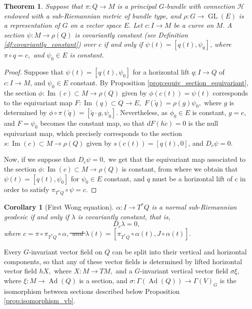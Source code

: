 \documentclass[12pt, letterpaper, reqno]{amsart}
\theoremstyle{definition}
\theoremstyle{plain}
\newtheorem{thm}{Theorem}
\newtheorem{cor}{Corollary}
\theoremstyle{remark}
\providecommand{\DIFadd}[1]{{\protect\color{blue}\uwave{#1}}} %
\providecommand{\DIFdel}[1]{{\protect\color{red}\sout{#1}}}                      %
\providecommand{\DIFaddbegin}{} %
\providecommand{\DIFaddend}{} %
\providecommand{\DIFdelbegin}{} %
\providecommand{\DIFdelend}{} %
\newcommand{\DIFscaledelfig}{0.5}
\newlength{\DIFdelgraphicswidth} %
\newlength{\DIFdelgraphicsheight} %
\newcommand{\DIFaddincludegraphics}[2][]{{\color{blue}\fbox{\DIFOincludegraphics[#1]{#2}}}} %
\newcommand{\DIFdelincludegraphics}[2][]{%
\sbox{\DIFdelgraphicsbox}{\DIFOincludegraphics[#1]{#2}}%
\settoboxwidth{\DIFdelgraphicswidth}{\DIFdelgraphicsbox} %
\settoboxtotalheight{\DIFdelgraphicsheight}{\DIFdelgraphicsbox} %
\scalebox{\DIFscaledelfig}{%
\parbox[b]{\DIFdelgraphicswidth}{\usebox{\DIFdelgraphicsbox}\\[-\baselineskip] \rule{\DIFdelgraphicswidth}{0em}}\llap{\resizebox{\DIFdelgraphicswidth}{\DIFdelgraphicsheight}{%
\setlength{\unitlength}{\DIFdelgraphicswidth}%
\begin{picture}(1,1)%
\thicklines\linethickness{2pt} %
{\color[rgb]{1,0,0}\put(0,0){\framebox(1,1){}}}%
{\color[rgb]{1,0,0}\put(0,0){\line( 1,1){1}}}%
{\color[rgb]{1,0,0}\put(0,1){\line(1,-1){1}}}%
\end{picture}%
}\hspace*{3pt}}} %
} %
\DeclareRobustCommand{\DIFaddbegin}{\DIFOaddbegin \let\includegraphics\DIFaddincludegraphics} %
\DeclareRobustCommand{\DIFaddend}{\DIFOaddend \let\includegraphics\DIFOincludegraphics} %
\DeclareRobustCommand{\DIFdelbegin}{\DIFOdelbegin \let\includegraphics\DIFdelincludegraphics} %
\DeclareRobustCommand{\DIFdelend}{\DIFOaddend \let\includegraphics\DIFOincludegraphics} %
\begin{document}
\begin{thm}
	Suppose that $ \pi: Q \rightarrow M $  is a principal $ G $-bundle with connection $ \mathcal{H} $ endowed with a sub-Riemannian metric of bundle type,  and $ \rho: G \rightarrow \operatorname{GL} (E) $ is a representation of $ G $ on a vector space $ E. $ Let $ c: I \rightarrow M $ be a curve on $ M. $ A section $ \psi: M \rightarrow \rho(Q) $   is covariantly constant (see Definition \ref{df:covariantly_constant}) over $ c $  if and only if $ \psi(t)= [q(t), \psi_0] $, where $ \pi\circ q = c,  $ and $ \psi_0\in E $ is constant.
\end{thm}
\begin{proof}
	Suppose that $ \psi(t)= [q(t), \psi_0] $ for a horizontal lift $ q: I \rightarrow Q $ of $ c: I \rightarrow M $, and $ \psi_0\in E $ constant. By Proposition \ref{prop:equiv_section_equivariant}, the section $ \phi: \operatorname{Im} (c)\subset M \rightarrow \rho(Q) $ given by $ \phi(c(t))=\psi(t) $ corresponds to the equivariant map $ F: \operatorname{Im} (q)  \subset Q \rightarrow E, $ $ F(\tilde q)= \rho(g)\psi_0, $ where $ g $ is determined by $ \phi\circ\pi(\tilde q) = [\tilde q \cdot g, \psi_0]. $ Nevertheless, as $ \phi_0\in E $ is constant, $ g=e, $ and $ F=\psi_0 $ becomes the constant map, so that $ dF(h\dot{c})=0 $ is the null equivariant map, which precisely corresponds to the section $ s: \operatorname{Im} (c) \subset M \rightarrow \rho(Q) $ given by $ s(c(t)) =[q(t), 0] $, and $ D_{\dot{c}}\psi=0. $ 

	Now, if we suppose that $ D_{\dot{c}}\psi=0, $ we get that the equivariant map associated to the section $ \phi: \operatorname{Im} (c)\subset M \rightarrow \rho(Q) $ is constant, from where we obtain that $ \psi(t)=[q(t), \psi_0] $ for $ \psi_0\in E $ constant, and $ q $ must be a horizontal lift of $ c $ in order to satisfy $ \pi_{T^*Q}\circ\psi =c. $ 
\end{proof}

\DIFdelbegin %
\DIFdelend \DIFaddbegin \begin{cor}[First Wong equation]\DIFaddend \label{cor:fwe}
	$\alpha: I \rightarrow T^*Q$ is a normal sub-Riemannian geodesic if and only if \DIFdelbegin \DIFdel{$ \lambda$ }\DIFdelend \DIFaddbegin \DIFadd{$ \lambda(t):=[ \pi_{T^*Q}\circ\alpha(t), J\circ\alpha(t)]$ }\DIFaddend is covariantly constant, that is, $$ D_{\dot{c}}\lambda =0, $$ where \DIFdelbegin \DIFdel{$ c=\pi\circ\pi_{T^*Q}\circ\alpha, $ and $ \lambda(t)=[ \pi_{T^*Q}\circ\alpha(t), J\circ\alpha(t)]. $ 
}\DIFdelend \DIFaddbegin \DIFadd{$ c=\pi\circ\pi_{T^*Q}\circ\alpha. $ 
}\DIFaddend \end{cor}
Every $ G $-invariant vector field on $ Q $ can be split into their vertical and horizontal components, so that any of these vector fields is determined by lifted horizontal vector field $ hX, $ where $ X: M \rightarrow TM, $ and a $ G $-invariant vertical vector field $ \sigma\xi, $ where $ \xi: M \rightarrow \operatorname{Ad} (Q) $ is a section, and $ \sigma: \Gamma( \operatorname{Ad} (Q)) \rightarrow \Gamma(V)_G $ is the isomorphism between sections described below Proposition \ref{prop:isomorphism_vb}.
\end{document}
